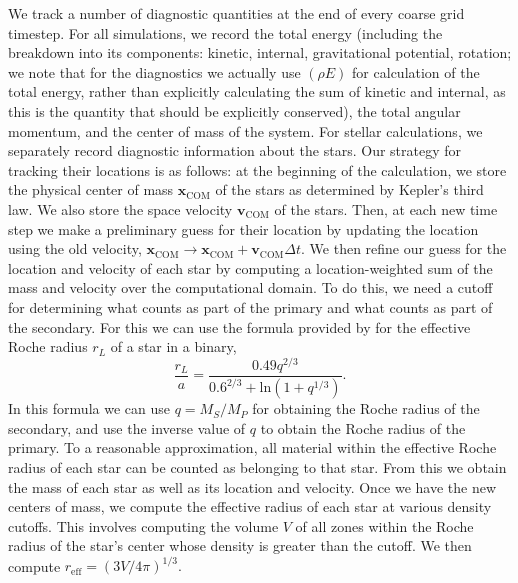 \documentclass[iop]{../emulateapj}
\begin{document}
We track a number of diagnostic quantities at the end of every coarse grid timestep. 
For all simulations, we record the total energy (including the breakdown into
its components: kinetic, internal, gravitational potential, rotation; we note
that for the diagnostics we actually use $(\rho E)$ for calculation of the total energy,
rather than explicitly calculating the sum of kinetic and internal, as this is
the quantity that should be explicitly conserved), 
the total angular momentum, and the center of mass of the system. 
For stellar calculations, we separately record diagnostic 
information about the stars. Our strategy for tracking their 
locations is as follows: at the beginning of the calculation, we store the 
physical center of mass $\mathbf{x}_{\text{COM}}$ of the stars as determined 
by Kepler's third law. We also store the space velocity $\mathbf{v}_{\text{COM}}$ 
of the stars. Then, at each new time step we make a preliminary guess for their 
location by updating the location using the old velocity, 
$\mathbf{x}_{\text{COM}} \rightarrow \mathbf{x}_{\text{COM}} + \mathbf{v}_{\text{COM}} \Delta t$.
We then refine our guess for the location and velocity of each star by computing a
location-weighted sum of the mass and velocity over the computational domain. 
To do this, we need a cutoff for determining what counts as part of the primary 
and what counts as part of the secondary. For this we can use the formula provided by 
\citet{eggleton:1983} for the effective Roche radius $r_L$ of a star in a binary,
\begin{equation}
  \frac{r_L}{a} = \frac{0.49 q^{2/3}}{0.6^{2/3} + \text{ln}(1 + q^{1/3})}.
\end{equation}
In this formula we can use $q = M_S / M_P$ for obtaining the Roche radius of the secondary,
and use the inverse value of $q$ to obtain the Roche radius of the primary.
To a reasonable approximation, all material within the effective Roche radius
of each star can be counted as belonging to that star. From this we obtain the mass
of each star as well as its location and velocity. Once we have the new centers of mass,
we compute the effective radius of each star at various density cutoffs. This involves 
computing the volume $V$ of all zones within the Roche radius of the star's center 
whose density is greater than the cutoff. We then compute $r_{\text{eff}} = (3V/4\pi)^{1/3}.$
\end{document}
